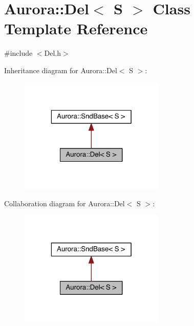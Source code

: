 \hypertarget{class_aurora_1_1_del}{}\section{Aurora\+:\+:Del$<$ S $>$ Class Template Reference}
\label{class_aurora_1_1_del}


{\ttfamily \#include $<$Del.\+h$>$}



Inheritance diagram for Aurora\+:\+:Del$<$ S $>$\+:\nopagebreak
\begin{figure}[H]
\begin{center}
\leavevmode
\includegraphics[width=196pt]{class_aurora_1_1_del__inherit__graph}
\end{center}
\end{figure}


Collaboration diagram for Aurora\+:\+:Del$<$ S $>$\+:\nopagebreak
\begin{figure}[H]
\begin{center}
\leavevmode
\includegraphics[width=196pt]{class_aurora_1_1_del__coll__graph}
\end{center}
\end{figure}
